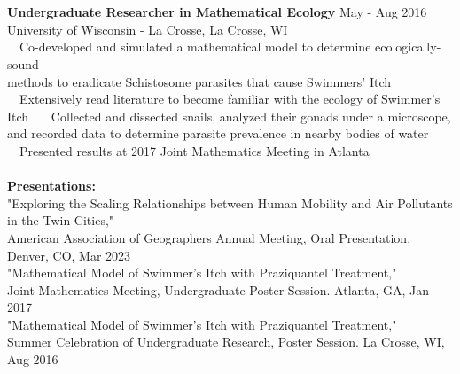 \documentclass[letterpaper,12pt]{article}
\numberwithin{equation}{section}
\begin{document}
\\\\
\hspace*{1.16in} \textbf{Undergraduate Researcher in Mathematical Ecology} \hspace*{.76in} May - Aug 2016\\
\hspace*{1.16in} University of Wisconsin - La Crosse, La Crosse, WI \vspace*{.1cm}\\
\hspace*{1.2in} \textbullet ~~Co-developed and simulated a mathematical model to determine ecologically-sound \\\hspace*{1.6in} methods to eradicate Schistosome parasites that cause Swimmers' Itch \\
\hspace*{1.2in} \textbullet ~~Extensively read literature to become familiar with the ecology of Swimmer's Itch
\hspace*{1.2in} \textbullet ~~~Collected and dissected snails, analyzed their gonads under a microscope, \\
\hspace*{1.6in} and recorded data to determine parasite prevalence in nearby bodies of water\\
\hspace*{1.2in} \textbullet ~~Presented results at 2017 Joint Mathematics Meeting in Atlanta
\\\\
\noindent\textbf{Presentations:}
\vspace*{.3cm} \\
"Exploring the Scaling Relationships between Human Mobility and Air Pollutants in the Twin Cities,"
\\ \indent American Association of Geographers Annual Meeting, Oral Presentation. Denver, CO, Mar 2023
\vspace*{.1cm} \\
"Mathematical Model of Swimmer's Itch with Praziquantel Treatment," 
\\ \indent Joint Mathematics Meeting, Undergraduate Poster Session. Atlanta, GA, Jan 2017
\vspace*{.1cm} \\
"Mathematical Model of Swimmer's Itch with Praziquantel Treatment,"
\\ \indent Summer Celebration of Undergraduate Research, Poster Session. La Crosse, WI, Aug 2016
\\\\
\end{document}
